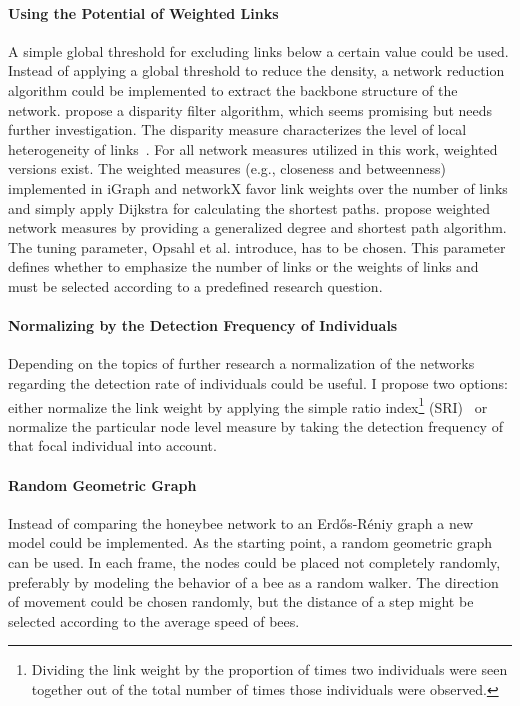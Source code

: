 \paragraph{Using the Potential of Weighted Links}
A simple global threshold for excluding links below a certain value could be used.
Instead of applying a global threshold to reduce the density, a network reduction algorithm could be implemented to extract the backbone structure of the network.
\textcite{serrano2009extracting} propose a disparity filter algorithm, which seems promising but needs further investigation.
The disparity measure characterizes the level of local heterogeneity of links~\cite{barthelemy2003spatial}.
For all network measures utilized in this work, weighted versions exist.
The weighted measures (e.g., closeness and betweenness) implemented in iGraph and networkX favor link weights over the number of links and simply apply Dijkstra for calculating the shortest paths. \textcite{opsahl2010node} propose weighted network measures by providing a generalized degree and shortest path algorithm. The tuning parameter, Opsahl et al. introduce, has to be chosen. This parameter defines whether to emphasize the number of links or the weights of links and must be selected according to a predefined research question.


\paragraph{Normalizing by the Detection Frequency of Individuals}
Depending on the topics of further research a normalization of the networks regarding the detection rate of individuals could be useful.
I propose two options: either normalize the link weight by applying the simple ratio index\footnote{Dividing the link weight by the proportion of times two individuals were seen together out of the total number of times those individuals were observed.} (SRI)~\cite{formica2012fitness} or normalize the particular node level measure by taking the detection frequency of that focal individual into account.

\paragraph{Random Geometric Graph}
Instead of comparing the honeybee network to an Erd\H{o}s-R\'{e}niy graph a new model could be implemented.
As the starting point, a random geometric graph~\cite{rgg2002} can be used.
In each frame, the nodes could be placed not completely randomly, preferably by modeling the behavior of a bee as a random walker.
The direction of movement could be chosen randomly, but the distance of a step might be selected according to the average speed of bees.


